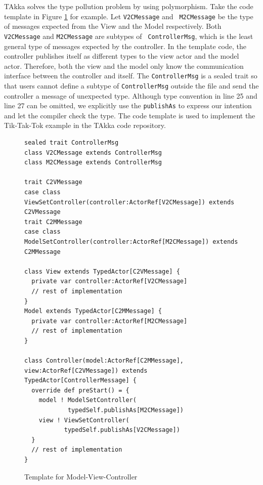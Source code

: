 TAkka solves the type pollution problem by using polymorphism.  Take the
code template in Figure \ref{MVC} for example. Let {\tt V2CMessage} and {\tt 
M2CMessage} be the type of messages expected from the View and the Model
respectively.  Both {\tt V2CMessage} and {\tt M2CMessage} are subtypes of {\tt
ControllerMsg}, which is the least general type of messages expected by the 
controller. In the template code, the controller publishes itself as different 
types to the view actor and the model actor.  Therefore, both the view and the
model only know the communication interface between the controller and itself.
The {\tt ControllerMsg} is a sealed trait so that users cannot define a 
subtype of 
{\tt ControllerMsg} outside the file and send the controller a message of 
unexpected type.  Although type convention in line 25 and line 27 can be 
omitted, we explicitly use the {\tt publishAs} to express our intention and 
let the compiler check the type.  The code template is used to implement the 
Tik-Tak-Tok example in the TAkka code repository.

\begin{figure}[h]
\label{MVC}
\begin{lstlisting}
sealed trait ControllerMsg
class V2CMessage extends ControllerMsg
class M2CMessage extends ControllerMsg

trait C2VMessage
case class ViewSetController(controller:ActorRef[V2CMessage]) extends 
C2VMessage
trait C2MMessage
case class ModelSetController(controller:ActorRef[M2CMessage]) extends 
C2MMessage

class View extends TypedActor[C2VMessage] {
  private var controller:ActorRef[V2CMessage]
  // rest of implementation
}
Model extends TypedActor[C2MMessage] {
  private var controller:ActorRef[M2CMessage]
  // rest of implementation
}

class Controller(model:ActorRef[C2MMessage], view:ActorRef[C2VMessage]) extends 
TypedActor[ControllerMessage] {
  override def preStart() = {
    model ! ModelSetController(
            typedSelf.publishAs[M2CMessage])
    view ! ViewSetController(
           typedSelf.publishAs[V2CMessage])
  }
  // rest of implementation
}
\end{lstlisting}
\caption{Template for Model-View-Controller}
\end{figure}




